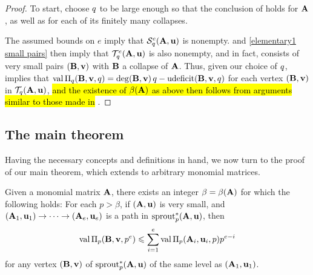 \documentclass{article}
\begin{document}
\begin{proof}
   To start, choose $q$ to be large enough so that the conclusion of  holds for $\mathbf{A}$, as well as for each of its finitely many collapses.
   
   The assumed bounds on $e$ imply that $\mathcal{S}_{q}^e(\mathbf{A}, \mathbf{u})$ is nonempty.  and \ref{elementary1 small pairs} then imply that $\mathcal{T}_{q}^e(\mathbf{A}, \mathbf{u})$ is also nonempty, and in fact, consists of very small pairs $(\mathbf{B}, \mathbf{v})$ with $\mathbf{B}$ a collapse of $\mathbf{A}$.  Thus, given our choice of $q$,  implies that $\operatorname{val} \Pi_q(\mathbf{B},\mathbf{v}, q) = \operatorname{deg}(\mathbf{B},\mathbf{v})\, q-\operatorname{udeficit}(\mathbf{B},\mathbf{v}, q)$  for each vertex $(\mathbf{B},\mathbf{v})$ in $\mathcal{T}_{q}(\mathbf{A},\mathbf{u})$, \hl{and the existence of $\beta(\mathbf{A})$ as above then follows from arguments similar to those made in} . 
\end{proof}

\subsection{The main theorem}


Having the necessary concepts and definitions in hand, we now turn to the proof of our main theorem, which extends  to arbitrary monomial matrices.

\begin{lemma}\label{lem: upper bound for higher mu}
   Given a monomial matrix $\mathbf{A}$, there exists an integer $\beta= \beta(\mathbf{A})$ for which the following holds\textup:
   For each $p>\beta$, if $(\mathbf{A}, \mathbf{u})$ is very small, and $(\mathbf{A}_1, \mathbf{u}_1) \to \cdots \to (\mathbf{A}_e, \mathbf{u}_e)$ is a path in $\operatorname{sprout}^{\ast}_p(\mathbf{A},\mathbf{u})$,  then
   \[
      \operatorname{val} \Pi_p(\mathbf{B}, \mathbf{v}, p^e) \leqslant \sum_{i=1}^e \operatorname{val} \Pi_p(\mathbf{A}_i, \mathbf{u}_i, p)p^{e-i}
   \]
   for any vertex $(\mathbf{B}, \mathbf{v})$ of $\operatorname{sprout}^{\ast}_p(\mathbf{A},\mathbf{u})$ of the same level as $(\mathbf{A}_1, \mathbf{u}_1)$.
\end{lemma}
\end{document}
